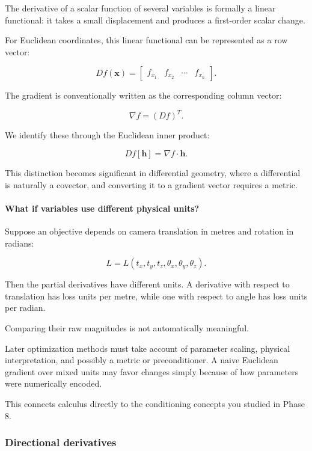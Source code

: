The derivative of a scalar function of several variables is formally a linear functional: it takes a small displacement and produces a first-order scalar change.

For Euclidean coordinates, this linear functional can be represented as a row vector:

\[
Df(\mathbf x)= \begin{bmatrix} f_{x_1}&f_{x_2}&\cdots&f_{x_n} \end{bmatrix}.
\]

The gradient is conventionally written as the corresponding column vector:

\[
\nabla f=(Df)^T.
\]

We identify these through the Euclidean inner product:

\[
Df[\mathbf h]=\nabla f\cdot\mathbf h.
\]

This distinction becomes significant in differential geometry, where a differential is naturally a covector, and converting it to a gradient vector requires a metric.

\paragraph{What if variables use different physical units?}\label{02-foundations-ii-ch021-what-if-variables-use-different-physical-units}

Suppose an objective depends on camera translation in metres and rotation in radians:

\[
L=L(t_x,t_y,t_z,\theta_x,\theta_y,\theta_z).
\]

Then the partial derivatives have different units. A derivative with respect to translation has loss units per metre, while one with respect to angle has loss units per radian.

Comparing their raw magnitudes is not automatically meaningful.

Later optimization methods must take account of parameter scaling, physical interpretation, and possibly a metric or preconditioner. A naive Euclidean gradient over mixed units may favor changes simply because of how parameters were numerically encoded.

This connects calculus directly to the conditioning concepts you studied in Phase 8.

\subsubsection{Directional derivatives}\label{02-foundations-ii-ch021-directional-derivatives}

